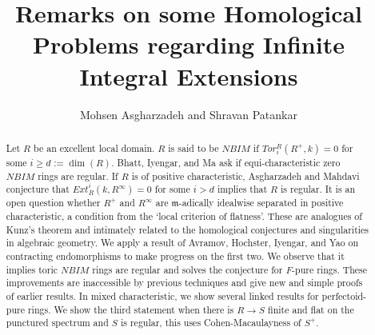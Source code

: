 \documentclass[12pt,reqno]{amsart}
\theoremstyle{definition}
\theoremstyle{remark}
\theoremstyle{cited}
\theoremstyle{remark}
\theoremstyle{citeddef}
\begin{document}
	
	\title[Homology of Infinite Integral Extensions]{Remarks on some Homological Problems regarding Infinite Integral Extensions}
	
	\author{Mohsen Asgharzadeh and Shravan Patankar}
	
	\address{Mohsen Asgharzadeh, Hakimiyeh, Tehran, Iran.}
	
	\address{Shravan Patankar, Farmington Hills, Michigan, USA.}
	
	
	
	
	
	
	\begin{abstract}
Let $R$ be an excellent local domain. $R$ is said to be $NBIM$ if $Tor_{i}^{R}(R^{+}, k) = 0$ for some $i\geq d:=\dim(R)$. Bhatt, Iyengar, and Ma ask if equi-characteristic zero $NBIM$ rings are regular. If $R$ is of positive characteristic, Asgharzadeh and Mahdavi conjecture that $Ext^{i}_{R}(k,R^{\infty}) = 0$ for some $i>d$ implies that $R$ is regular. It is an open question whether $R^{+}$ and $R^{\infty}$ are $\mathfrak{m}$-adically idealwise separated in positive characteristic, a condition from the `local criterion of flatness'. These are analogues of Kunz's theorem and intimately related to the homological conjectures and singularities in algebraic geometry.
We apply a result of Avramov, Hochster, Iyengar, and Yao on contracting endomorphisms to make progress on the first two. We observe that it implies toric $NBIM$ rings are regular and solves the conjecture for $F$-pure rings. These improvements are inaccessible by previous techniques and give new and simple proofs of earlier results. In mixed characteristic, we show several linked results for perfectoid-pure rings. We show the third statement when there is $R\rightarrow S$ finite and flat on the punctured spectrum and $S$ is regular, this uses Cohen-Macaulayness of $S^{+}$.
	\end{abstract}
	
	
	\maketitle
	
	\tableofcontents
	
\end{document}
